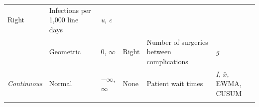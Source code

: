 \documentclass[12pt,openany]{book}
\numberwithin{dummy}{section}
\theoremstyle{ocrenumbox}
\theoremstyle{ocrenumb}
\theoremstyle{blacknumex}
\theoremstyle{blacknumbox}
\theoremstyle{ocrenum}
\begin{document}
\begin{longtable}[]{@{}llllll@{}}
\begin{minipage}[t]{0.07\columnwidth}
Right\strut
\end{minipage} & \begin{minipage}[t]{0.13\columnwidth}\raggedright
Infections per 1,000 line days\strut
\end{minipage} & \begin{minipage}[t]{0.16\columnwidth}\raggedright
\emph{u}, \emph{c}\strut
\end{minipage}\tabularnewline
\begin{minipage}[t]{0.16\columnwidth}\raggedright
\strut
\end{minipage} & \begin{minipage}[t]{0.22\columnwidth}\raggedright
Geometric\strut
\end{minipage} & \begin{minipage}[t]{0.09\columnwidth}\raggedright
0, \(\infty\)\strut
\end{minipage} & \begin{minipage}[t]{0.07\columnwidth}\raggedright
Right\strut
\end{minipage} & \begin{minipage}[t]{0.13\columnwidth}\raggedright
Number of surgeries between complications\strut
\end{minipage} & \begin{minipage}[t]{0.16\columnwidth}\raggedright
\emph{g}\strut
\end{minipage}\tabularnewline
\begin{minipage}[t]{0.16\columnwidth}\raggedright
\emph{Continuous}\strut
\end{minipage} & \begin{minipage}[t]{0.22\columnwidth}\raggedright
Normal\strut
\end{minipage} & \begin{minipage}[t]{0.09\columnwidth}\raggedright
\(-\infty\), \(\infty\)\strut
\end{minipage} & \begin{minipage}[t]{0.07\columnwidth}\raggedright
None\strut
\end{minipage} & \begin{minipage}[t]{0.13\columnwidth}\raggedright
Patient wait times\strut
\end{minipage} & \begin{minipage}[t]{0.16\columnwidth}\raggedright
\emph{I}, \(\bar{x}\), EWMA, CUSUM\strut
\end{minipage}\tabularnewline
\begin{minipage}[t]{0.16\columnwidth}\raggedright
\strut
\end{minipage} & \begin{minipage}[t]{0.22\columnwidth}\raggedright

\end{minipage}
\end{longtable}
\end{document}
